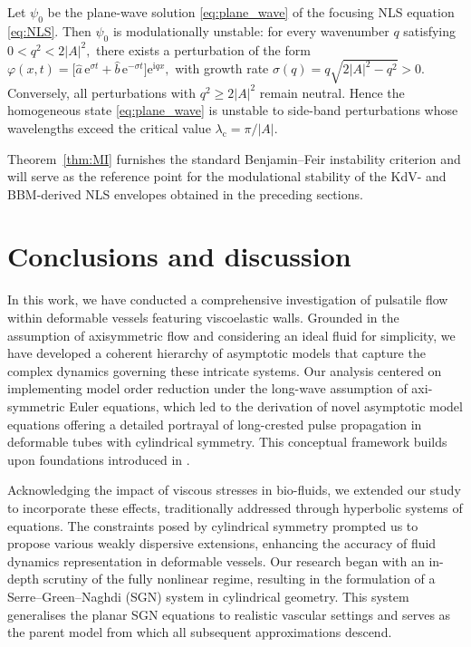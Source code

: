 \documentclass[alpha-refs, 12pt]{wiley-article}
\begin{document}
\begin{theorem}\label{thm:MI}
  Let $\psi_{0}$ be the plane-wave solution \eqref{eq:plane_wave} of the
  focusing NLS equation \eqref{eq:NLS}.  Then $\psi_{0}$ is modulationally
  unstable: for every wavenumber $q$ satisfying
  \(
    0<q^{2}<2|A|^{2},
  \)
  there exists a perturbation of the form
  \(
    \displaystyle
    \varphi(x,t)=\bigl[\hat{a}\,\mathrm{e}^{\sigma t}
                     +\hat{b}\,\mathrm{e}^{-\sigma t}\bigr]
                 \mathrm{e}^{\mathrm{i}qx},
  \)
  with growth rate
  \(
    \displaystyle
    \sigma(q)=q\sqrt{2|A|^{2}-q^{2}}>0.
  \)
  Conversely, all perturbations with $q^{2}\ge2|A|^{2}$ remain
  neutral.  Hence the homogeneous state \eqref{eq:plane_wave} is unstable
  to side-band perturbations whose wavelengths exceed the critical value
  \(
    \lambda_{\mathrm{c}}=\pi/|A|.
  \)
\end{theorem}
Theorem~\ref{thm:MI} furnishes the standard Benjamin--Feir instability criterion and will serve as the reference point for the modulational stability of the KdV- and BBM-derived NLS envelopes obtained in the preceding sections.

\section{Conclusions and discussion}

In this work, we have conducted a comprehensive investigation of pulsatile flow within deformable vessels featuring viscoelastic walls. Grounded in the assumption of axisymmetric flow and considering an ideal fluid for simplicity, we have developed a coherent hierarchy of asymptotic models that capture the complex dynamics governing these intricate systems. Our analysis centered on implementing model order reduction under the long-wave assumption of axi-symmetric Euler equations, which led to the derivation of novel asymptotic model equations offering a detailed portrayal of long-crested pulse propagation in deformable tubes with cylindrical symmetry. This conceptual framework builds upon foundations introduced in \cite{Mitsotakis2018}.

Acknowledging the impact of viscous stresses in bio-fluids, we extended our study to incorporate these effects, traditionally addressed through hyperbolic systems of equations. The constraints posed by cylindrical symmetry prompted us to propose various weakly dispersive extensions, enhancing the accuracy of fluid dynamics representation in deformable vessels. Our research began with an in-depth scrutiny of the fully nonlinear regime, resulting in the formulation of a Serre--Green--Naghdi (SGN) system in cylindrical geometry. This system generalises the planar SGN equations to realistic vascular settings and serves as the parent model from which all subsequent approximations descend.
\end{document}
